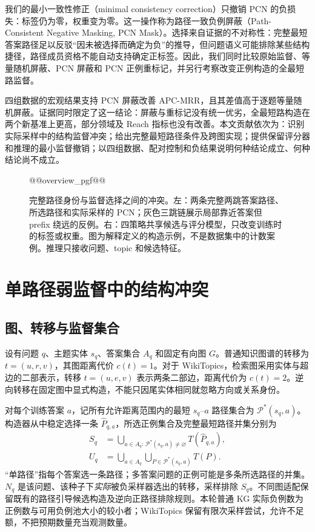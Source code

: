 \documentclass[UTF8,a4paper,10pt,fontset=fandol]{ctexart}
\begin{document}
我们的最小一致性修正（minimal consistency correction）只撤销 PCN 的负损失：标签仍为零，权重变为零。这一操作称为路径一致负例屏蔽（Path-Consistent Negative Masking, PCN Mask）。选择来自证据的不对称性：完整最短答案路径足以反驳“因未被选择而确定为负”的推导，但问题语义可能排除某些结构捷径，路径成员资格不能自动支持确定正标签。因此，我们同时比较原始监督、等量随机屏蔽、PCN 屏蔽和 PCN 正例重标记，并另行考察改变正例构造的全最短路监督。

四组数据的宏观结果支持 PCN 屏蔽改善 APC-MRR，且其差值高于逐题等量随机屏蔽。证据同时限定了这一结论：屏蔽与重标记没有统一优劣，全最短路构造在两个新基准上更高，部分领域及 Reach 指标也没有改善。本文贡献依次为：识别实际采样中的结构监督冲突；给出完整最短路径条件及跨图实现；提供保留评分器和推理的最小监督撤销；以四组数据、配对控制和负结果说明何种结论成立、何种结论尚不成立。

\begin{figure}[tbp]
\centering
\begin{lrbox}{\pcnfigurebox}
@@overview_pgf@@
\end{lrbox}\resizebox{\linewidth}{!}{\usebox{\pcnfigurebox}}
\caption{完整路径身份与监督选择之间的冲突。左：两条完整两跳答案路径、所选路径和实际采样的 PCN；灰色三跳链展示局部靠近答案但 prefix 绕远的反例。右：四策略共享候选与评分模型，只改变训练时的标签或权重。图为解释定义的构造示例，不是数据集中的计数案例。推理只接收问题、topic 和候选特征。}\label{fig:overview}
\end{figure}

\section{单路径弱监督中的结构冲突}
\subsection{图、转移与监督集合}
设有问题 $q$、主题实体 $s_q$、答案集合 $A_q$ 和固定有向图 $G$。普通知识图谱的转移为 $t=(u,r,v)$，其图距离代价 $c(t)=1$。对于 WikiTopics，检索图采用实体与超边的二部表示，转移 $t=(u,e,v)$ 表示两条二部边，距离代价为 $c(t)=2$。逆向转移在固定图中显式构造，不能只因尾实体相同就忽略方向或关系身份。

对每个训练答案 $a$，记所有允许距离范围内的最短 $s_q$--$a$ 路径集合为 $\mathcal P^*(s_q,a)$。构造器从中稳定选择一条 $\widehat P_{q,a}$，所选正例集合及完整最短路径并集分别为
\begin{align}
S_q &= \bigcup_{a\in A_q:\,\mathcal P^*(s_q,a)\ne\varnothing} T(\widehat P_{q,a}),\\
U_q &= \bigcup_{a\in A_q} \bigcup_{P\in\mathcal P^*(s_q,a)}T(P).
\end{align}
“单路径”指每个答案选一条路径；多答案问题的正例可能是多条所选路径的并集。$N_q$ 是该问题、该种子下\emph{实际}被负采样器选出的转移，采样排除 $S_q$。不同图适配保留既有的路径引导候选构造及逆向正路径排除规则。本轮普通 KG 实际负例数为正例数与可用负例池大小的较小者；WikiTopics 保留有限次采样尝试，允许不足额，不把预期数量充当观测数量。
\end{document}
